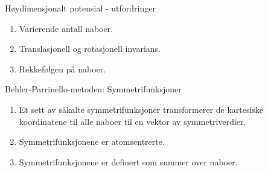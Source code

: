 \documentclass{beamer}
\begin{document}
\begin{frame}

\begin{block}{Høydimensjonalt potensial - utfordringer}
 \begin{enumerate} 
  \item Varierende antall naboer. 
  \item Translasjonell og rotasjonell invarians. 
  \item Rekkefølgen på naboer. 
 \end{enumerate}
\end{block}

\begin{block}{Behler-Parrinello-metoden: Symmetrifunksjoner}
 \begin{enumerate}
  \item Et sett av såkalte symmetrifunksjoner transformerer de kartesiske koordinatene til alle naboer 
  til en vektor av symmetriverdier.
  \item Symmetrifunksjonene er atomsentrerte. 
  \item Symmetrifunksjonene er definert som summer over naboer. 
 \end{enumerate}
\end{block}

\end{frame}
\end{document}
